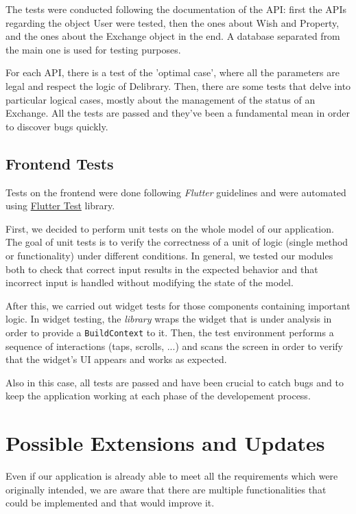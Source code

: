 The tests were conducted following the documentation of the API: first the APIs regarding the object User were tested, then the ones about Wish and Property, and the ones about the Exchange object in the end.
A database separated from the main one is used for testing purposes.

For each API, there is a test of the 'optimal case', where all the parameters are legal and respect the logic of Delibrary.
Then, there are some tests that delve into particular logical cases, mostly about the management of the status of an Exchange.
All the tests are passed and they've been a fundamental mean in order to discover bugs quickly.

\section{Frontend Tests}
Tests on the frontend were done following \emph{Flutter} guidelines and were automated using \href{https://api.flutter.dev/flutter/flutter_test/flutter_test-library.html}{Flutter Test} library.

First, we decided to perform unit tests on the whole model of our application.
The goal of unit tests is to verify the correctness of a unit of logic (single method or functionality) under different conditions.
In general, we tested our modules both to check that correct input results in the expected behavior and that incorrect input is handled without modifying the state of the model.

After this, we carried out widget tests for those components containing important logic.
In widget testing, the \emph{library} wraps the widget that is under analysis in order to provide a \texttt{BuildContext} to it.
Then, the test environment performs a sequence of interactions (taps, scrolls, ...) and scans the screen in order to verify that the widget's UI appears and works as expected.

Also in this case, all tests are passed and have been crucial to catch bugs and to keep the application working at each phase of the developement process.



\chapter{Possible Extensions and Updates}
Even if our application is already able to meet all the requirements which were originally intended, we are aware that there are multiple functionalities that could be implemented and that would improve it.

